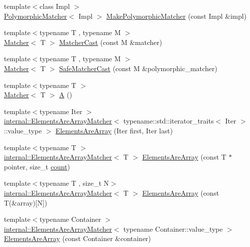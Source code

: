 \begin{DoxyCompactItemize}
\item 
{\footnotesize template$<$class Impl $>$ }\\\hyperlink{classtesting_1_1PolymorphicMatcher}{Polymorphic\+Matcher}$<$ Impl $>$ \hyperlink{namespacetesting_a667ca94f190ec2e17ee2fbfdb7d3da04}{Make\+Polymorphic\+Matcher} (const Impl \&impl)
\item 
{\footnotesize template$<$typename T , typename M $>$ }\\\hyperlink{classtesting_1_1Matcher}{Matcher}$<$ T $>$ \hyperlink{namespacetesting_a8234d15eee99b135a7fdf2141a2ebe1f}{Matcher\+Cast} (const M \&matcher)
\item 
{\footnotesize template$<$typename T , typename M $>$ }\\\hyperlink{classtesting_1_1Matcher}{Matcher}$<$ T $>$ \hyperlink{namespacetesting_ac016ac22aa065a19b9ef95f0ccffc17b}{Safe\+Matcher\+Cast} (const M \&polymorphic\+\_\+matcher)
\item 
{\footnotesize template$<$typename T $>$ }\\\hyperlink{classtesting_1_1Matcher}{Matcher}$<$ T $>$ \hyperlink{namespacetesting_a5e9134d655d2fc9323902348083282e7}{A} ()
\item 
{\footnotesize template$<$typename Iter $>$ }\\\hyperlink{classtesting_1_1internal_1_1ElementsAreArrayMatcher}{internal\+::\+Elements\+Are\+Array\+Matcher}$<$ typename\+::std\+::iterator\+\_\+traits$<$ Iter $>$\+::value\+\_\+type $>$ \hyperlink{namespacetesting_ae2eee06e7ddbf5f5372fd24372e9703f}{Elements\+Are\+Array} (Iter first, Iter last)
\item 
{\footnotesize template$<$typename T $>$ }\\\hyperlink{classtesting_1_1internal_1_1ElementsAreArrayMatcher}{internal\+::\+Elements\+Are\+Array\+Matcher}$<$ T $>$ \hyperlink{namespacetesting_abf5c2219b4e6a7542368b5f68eadd007}{Elements\+Are\+Array} (const T $\ast$pointer, size\+\_\+t \hyperlink{gmock__stress__test_8cc_afd9db40e3361ae09188795e8cbe19752}{count})
\item 
{\footnotesize template$<$typename T , size\+\_\+t N$>$ }\\\hyperlink{classtesting_1_1internal_1_1ElementsAreArrayMatcher}{internal\+::\+Elements\+Are\+Array\+Matcher}$<$ T $>$ \hyperlink{namespacetesting_ac5895c9867d6b976351446a043dcdd66}{Elements\+Are\+Array} (const T(\&array)\mbox{[}N\mbox{]})
\item 
{\footnotesize template$<$typename Container $>$ }\\\hyperlink{classtesting_1_1internal_1_1ElementsAreArrayMatcher}{internal\+::\+Elements\+Are\+Array\+Matcher}$<$ typename Container\+::value\+\_\+type $>$ \hyperlink{namespacetesting_ad257747adbe056feaa92f449063d681f}{Elements\+Are\+Array} (const Container \&container)

\end{DoxyCompactItemize}
